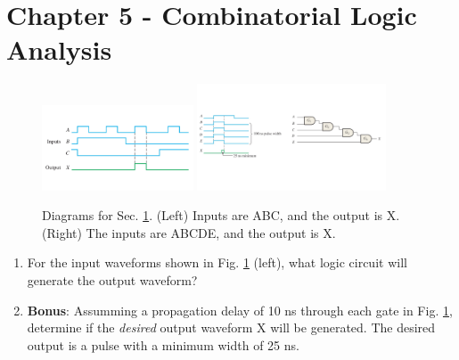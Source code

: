 \documentclass[10pt]{article}
\begin{document}
\section{Chapter 5 - Combinatorial Logic Analysis}
\label{sec:comb}
\begin{figure}[ht]
\centering
\includegraphics[width=0.4\textwidth,trim=0cm 3cm 0cm 2cm,clip=true]{timingExample7.pdf}
\includegraphics[width=0.5\textwidth,trim=0cm 4cm 0cm 2cm,clip=true]{bonus.pdf}
\caption{\label{fig:timing3} Diagrams for Sec. \ref{sec:comb}. (Left) Inputs are ABC, and the output is X. (Right) The inputs are ABCDE, and the output is X.}
\end{figure}
\begin{enumerate}
\item For the input waveforms shown in Fig. \ref{fig:timing3} (left), what logic circuit will generate the output waveform? \\ \vspace{2cm}
\item \textbf{Bonus}: Assumming a propagation delay of 10 ns through each gate in Fig. \ref{fig:timing3}, determine if the \textit{desired} output waveform X will be generated.  The desired output is a pulse with a minimum width of 25 ns.
\end{enumerate}
\end{document}
